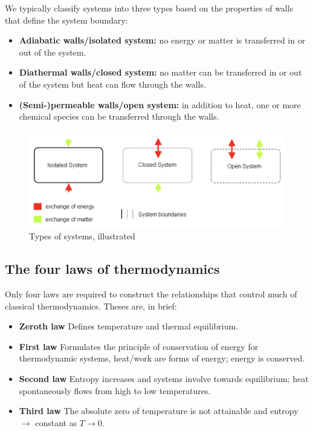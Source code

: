 We typically classify systems into three types based on the properties of walls that define the system boundary:
\begin{itemize}
\item {\bf Adiabatic walls/isolated system:} no energy or matter is transferred in or out of the system.
\item {\bf Diathermal walls/closed system:} no matter can be transferred in or out of the system but heat can flow through the walls.
\item {\bf (Semi-)permeable walls/open system:}  in addition to heat, one or more chemical species can be transferred through the walls. 
\end{itemize}
\begin{figure}[H]
	\centering
	\includegraphics[scale=0.5]{systems}
	\caption{Types of systems, illustrated}
\end{figure}

\subsection*{The four laws of thermodynamics}
Only four laws are required to construct the relationships that control much of classical thermodynamics. Theses are, in brief:
\begin{itemize}
\item {\bf Zeroth law} Defines temperature and thermal equilibrium. 
\item {\bf First law} Formulates the principle of conservation of energy for thermodynamic systems, heat/work are forms of energy; energy is conserved.
\item {\bf Second law} Entropy increases and systems involve towards equilibrium; heat spontaneously flows from high to low temperatures.
\item {\bf Third law} The absolute zero of temperature is not attainable and entropy $\rightarrow$ constant as $T \rightarrow 0$.
\end{itemize}


